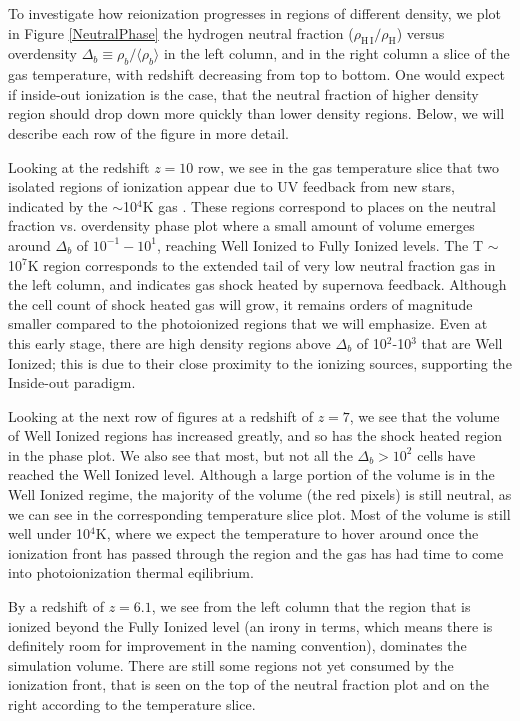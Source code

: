 To investigate how reionization progresses in regions of different density, we plot in Figure \ref{NeutralPhase} the hydrogen neutral fraction ($\rho_\mathrm{H\,I}/\rho_\mathrm{H}$) versus overdensity $\Delta_b\equiv\rho_b/\langle\rho_b\rangle$ in the left column, and in the right column a slice of the gas temperature, with redshift decreasing from top to bottom.  One would expect if inside-out ionization is the case, that the neutral fraction of higher density region should drop down more quickly than lower density regions.  Below, we will describe each row of the figure in more detail.

Looking at the redshift $z=10$ row, we see in the gas temperature slice that two isolated regions of ionization appear due to UV feedback from new stars, indicated by the $\sim$10$^4$K gas . These regions correspond to places on the neutral fraction vs. overdensity phase plot where a small amount of volume emerges around $\Delta_b$ of $10^{-1}-10^1$, reaching Well Ionized to Fully Ionized levels.  The T $\sim$10$^7$K region corresponds to the extended tail of very low neutral fraction gas in the left column, and indicates gas shock heated by supernova feedback.  Although the cell count of shock heated gas will grow, it remains orders of magnitude smaller compared to the photoionized regions that we will emphasize.  Even at this early stage, there are high density regions above $\Delta_b$ of 10$^2$-10$^3$ that are Well Ionized; this is due to their close proximity to the ionizing sources, supporting the Inside-out paradigm.

Looking at the next row of figures at a redshift of $z=7$, we see that the volume of Well Ionized regions has increased greatly, and so has the shock heated region in the phase plot.  We also see that most, but not all the $\Delta_b > 10^2$ cells have reached the Well Ionized level.  Although a large portion of the volume is in the Well Ionized regime, the majority of the volume (the red pixels) is still neutral, as we can see in the corresponding temperature slice plot.  Most of the volume is still well under 10$^4$K, where we expect the temperature to hover around once the ionization front has passed through the region and the gas has had time to come into photoionization thermal eqilibrium. 

By a redshift of $z=6.1$, we see from the left column that the region that is ionized beyond the Fully Ionized level (an irony in terms, which means there is definitely room for improvement in the naming convention), dominates the simulation volume.  There are still some regions not yet consumed by the ionization front, that is seen on the top of the neutral fraction plot and on the right according to the temperature slice.

